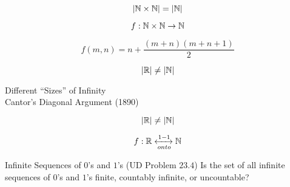 \begin{frame}{}
  \begin{theorem}
    \[
      |\mathbb{N} \times \mathbb{N}| = |\mathbb{N}|
    \]
  \end{theorem}

  \pause
  \[
    f: \mathbb{N} \times \mathbb{N} \to \mathbb{N} 
  \]

  \pause
  \[
    f(m,n) = n + \frac{(m+n)(m+n+1)}{2}
  \]
\end{frame}

\begin{frame}{}
  \begin{theorem}
    \[
      |\mathbb{R}| \neq |\mathbb{N}|
    \]
  \end{theorem}

  \pause

  \pause
  \begin{center}
    Different ``Sizes'' of Infinity \\[10pt] \pause
    Cantor's Diagonal Argument (1890)
  \end{center}

\end{frame}

\begin{frame}{}
  \begin{theorem}
    \[
      |\mathbb{R}| \neq |\mathbb{N}|
    \]
  \end{theorem}

  \pause
  \begin{center}

    \pause
    \[
      f: \mathbb{R} \xleftrightarrow[onto]{1-1} \mathbb{N}
    \]

    \pause

    \pause
  \end{center}
\end{frame}



\begin{frame}{}
  \begin{exampleblock}{Infinite Sequences of $0$'s and $1$'s (UD Problem $23.4$)}
    Is the set of all infinite sequences of $0$'s and $1$'s finite,
    countably infinite, or uncountable?
  \end{exampleblock}

  \pause
  \begin{center}
  \end{center}
\end{frame}

